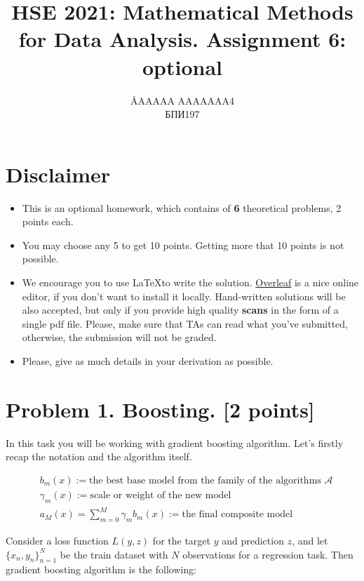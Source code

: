 \documentclass{article}
\title{HSE 2021: Mathematical Methods for Data Analysis. Assignment 6: optional}
\author{\AA{AAAAA AAAAAAA}{4} \\ БПИ197}
\begin{document}
\maketitle

\section*{Disclaimer}
\begin{itemize}
    \item This is an optional homework, which contains of \textbf{6} theoretical problems, 2 points each.
    \item You may choose any 5 to get 10 points. Getting more that 10 points is not possible.
    \item We encourage you to use \LaTeX to write the solution. \href{https://www.overleaf.com/}{Overleaf} is a nice online editor, if you don't want to install it locally. Hand-written solutions will be also accepted, but only if you provide high quality \textbf{scans} in the form of a single pdf file. Please, make sure that TAs can read what you've submitted, otherwise, the submission will not be graded.
    \item Please, give as much details in your derivation as possible.
\end{itemize}

\newpage
\section*{Problem 1. Boosting. [2 points]}

In this task you will be working with gradient boosting algorithm. Let's firstly recap the notation and the algorithm itself.

\begin{align}
    & b_m(x) := \text{the best base model from the family of the algorithms $\mathcal{A}$} \\
    & \gamma_m(x) := \text{scale or weight of the new model} \\
    & a_M(x) = \sum_{m=0}^M \gamma_m b_m(x) := \text{the final composite model}
\end{align}


Consider a loss function $L(y, z)$ for the target $y$ and prediction $z$, and let
$\{x_n, y_n\}_{n=1}^N$ be the train dataset with $N$ observations for a regression task. Then gradient boosting algorithm is the following:
\end{document}

